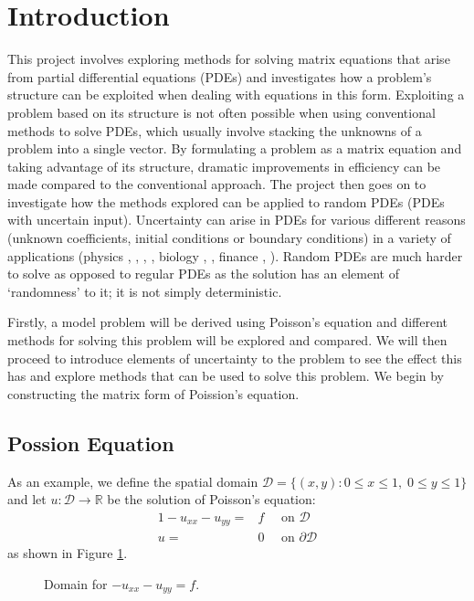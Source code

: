 \documentclass[11pt]{article}
\numberwithin{equation}{section}
\begin{document}
\section{Introduction}
This project involves exploring methods for solving matrix equations that arise from partial differential equations (PDEs) and investigates how a problem's structure can be exploited when dealing with equations in this form. Exploiting a problem based on its structure is not often possible when using conventional methods to solve PDEs, which usually involve stacking the unknowns of a problem into a single vector. By formulating a problem as a matrix equation and taking advantage of its structure, dramatic improvements in efficiency can be made compared to the conventional approach. The project then goes on to investigate how the methods explored can be applied to random PDEs (PDEs with uncertain input). Uncertainty can arise in PDEs for various different reasons (unknown coefficients, initial conditions or boundary conditions) in a variety of applications (physics \cite{Swanson}, \cite{Pryhara}, \cite{Breit}, \cite{Holm}, biology \cite{Bressloff}, \cite{Edwards}, finance \cite{Shreve03}, \cite{Shreve04}). Random PDEs are much harder to solve as opposed to regular PDEs as the solution has an element of `randomness' to it; it is not simply deterministic. 

Firstly, a model problem will be derived using Poisson's equation and different methods for solving this problem will be explored and compared. We will then proceed to introduce elements of uncertainty to the problem to see the effect this has and explore methods that can be used to solve this problem. We begin by constructing the matrix form of Poission's equation.

\subsection{Possion Equation}
As an example, we define the spatial domain $\mathcal{D} = \{(x,y) : 0 \leq x \leq 1, \; 0 \leq y \leq 1 \}$ and let $u: \mathcal{D} \to \mathbb{R}$ be the solution of Poisson's equation:
	\begin{alignat}{1} 
	-u_{xx} - u_{yy} = {} & f \quad \text{ on } \mathcal{D} \nonumber \\
	u = {} & 0 \quad \text{ on } \partial \mathcal{D}
	\end{alignat}
as shown in Figure \ref{fig:domain1}.

\begin{figure}[H]
\centering
\caption{Domain for $-u_{xx}-u_{yy}=f$.}
\label{fig:domain1}
\end{figure}
\end{document}
